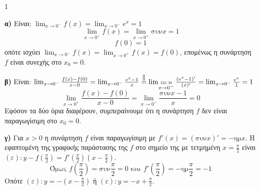 \begin{ylh}{1}
    \item [Λύση]
\end{ylh}
\begin{alist}
\item \textbf{α)} Είναι: $\lim_{x \to 0^-} f(x) = \lim_{x \to 0^-} e^x = 1$
\[
\lim_{x \to 0^+} f(x) = \lim_{x \to 0^+} \text{συν} x = 1
\]
\[
f(0) = 1
\]
οπότε ισχύει $\lim_{x \to 0^-} f(x) = \lim_{x \to 0^+} f(x) = f(0)$, επομένως η συνάρτηση $f$ είναι συνεχής στο $x_0 = 0$.

\item \textbf{β)} Είναι: $\lim_{x \to 0^-} \frac{f(x) - f(0)}{x - 0} = \lim_{x \to 0^-} \frac{e^x - 1}{x} \overset{\frac{0}{0}}{=} \lim_{\substack{\text{\tiny DL'H} \\ x \to 0^-}} \frac{(e^x - 1)'}{(x)'} = \lim_{x \to 0^-} \frac{e^x}{1} = 1$
\[
\lim_{x \to 0^+} \frac{f(x) - f(0)}{x - 0} = \lim_{x \to 0^+} \frac{\text{συν} x - 1}{x} = 0
\]
Εφόσον τα δύο όρια διαφέρουν, συμπεραίνουμε ότι η συνάρτηση $f$ δεν είναι παραγωγίσιμη στο $x_0 = 0$.

\item \textbf{γ)} Για $x > 0$ η συνάρτηση $f$ είναι παραγωγίσιμη με $f'(x) = (\text{συν} x)' = -\text{ημ} x$.
Η εφαπτομένη της γραφικής παράστασης της $f$ στο σημείο της με τετμημένη $x = \frac{\pi}{2}$ είναι $(\varepsilon): y - f\left(\frac{\pi}{2}\right) = f'\left(\frac{\pi}{2}\right)\left(x - \frac{\pi}{2}\right)$.
\[
\text{Όμως } f\left(\frac{\pi}{2}\right) = \text{συν} \frac{\pi}{2} = 0 \text{ και } f'\left(\frac{\pi}{2}\right) = -\text{ημ} \frac{\pi}{2} = -1
\]
Οπότε $(\varepsilon): y = -\left(x - \frac{\pi}{2}\right)$ ή $(\varepsilon): y = -x + \frac{\pi}{2}$.
\end{alist}